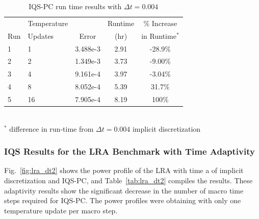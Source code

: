 \documentclass{elsarticle}
\newcommand{\fig}[1]{Fig.~\ref{#1}}                      %
\newcommand{\tbl}[1]{Table~\ref{#1}}                     %
\newcommand{\iqspc}{IQS-PC\xspace}
\begin{document}
\begin{table}[!htbp]
\begin{center}
\caption{\iqspc run time results with $\Delta t = 0.004$}
\label{tab:iqspc_lra}
\begin{tabular}{|l|l|ccc|}
\hline
	&  Temperature 	&  		& Runtime 	& \% Increase	\\
Run	&  Updates 	& Error & (hr)		& in Runtime$^*$\\
\hline
1	& 1		& 3.488e-3 	& 2.91 	& -28.9\%	\\
2	& 2		& 1.349e-3 	& 3.73	& -9.00\%	\\
\rowcolor{yellow} 3 	& 4 	& 9.161e-4 	& 3.97	& -3.04\%	\\
4 	& 8 	& 8.052e-4 	& 5.39	&  31.7\%	\\
5 	& 16	& 7.905e-4 	& 8.19	&  100\%	\\
\hline
\end{tabular}
\\
$^*$ difference in run-time from $\Delta t = 0.004$ implicit discretization 
\end{center}
\end{table}


\subsubsection{IQS Results for the LRA Benchmark with Time Adaptivity}

\fig{fig:lra_dt2} shows the power profile of the LRA with time a of implicit discretization and \iqspc, and \tbl{tab:lra_dt2} compiles the results. These adaptivity results show the significant decrease in the number of macro time steps required for \iqspc. The power profiles were obtaining with only one temperature update per macro step.
\end{document}
